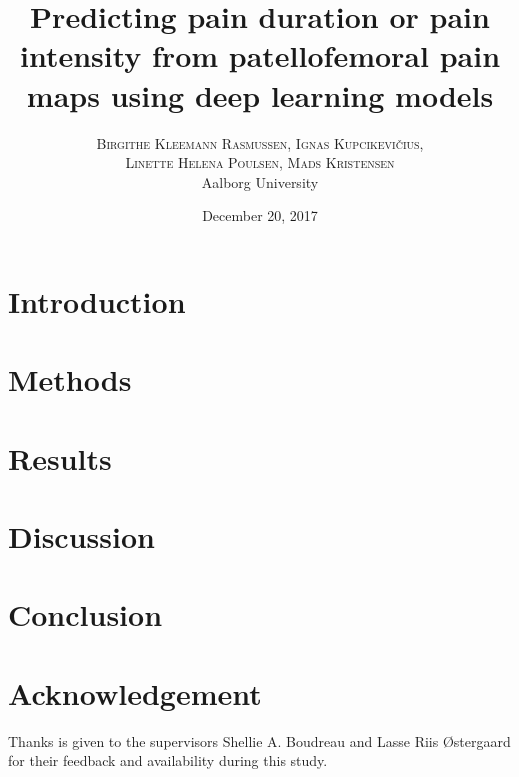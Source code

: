 \documentclass[twoside,twocolumn]{article}
\title{\huge Predicting pain duration or pain intensity from patellofemoral pain maps using  \newline deep learning models} %
\author{%
\textsc{Birgithe Kleemann Rasmussen, Ignas Kupcikevičius,} \\
\textsc{Linette Helena Poulsen, Mads Kristensen}
 \\[1ex] %
\normalsize Aalborg University \\ %
}
\date{December 20, 2017} %
\begin{document}
\maketitle


\section{Introduction}



\section{Methods}



\vspace{-0.5cm}
\section{Results}


\vspace{-0.3cm}
\section{Discussion}



\section{Conclusion}


\section{Acknowledgement}
Thanks is given to the supervisors Shellie A. Boudreau and Lasse Riis Østergaard for their feedback and availability during this study.  

\end{document}
